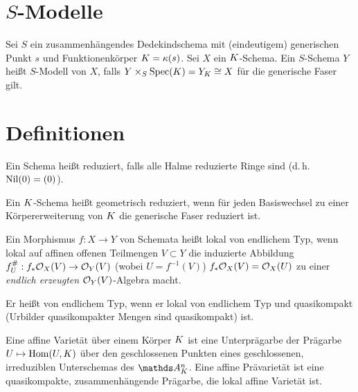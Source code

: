 \documentclass[german]{scrreprt}
\begin{document}
\chapter{$S$-Modelle}
\begin{Definition}[$S$-Modell]
Sei $S$ ein zusammenhängendes Dedekindschema mit (eindeutigem)
generischen Punkt $s$ und Funktionenkörper $K=\kappa(s)$.
Sei $X$ ein $K$-Schema.
Ein $S$-Schema $Y$ heißt $S$-Modell von $X$, falls
$Y\times_S\operatorname{Spec}(K)=Y_K\cong X$ für die generische Faser gilt.

\appendix
\chapter{Definitionen}
\begin{Definition}
  Ein Schema heißt reduziert, falls alle Halme reduzierte Ringe sind
  (d.\,h. $\operatorname{Nil}(0)=(0)$).

  Ein $K$-Schema heißt geometrisch reduziert, wenn für jeden
  Basiswechsel zu einer Körpererweiterung von $K$ die generische
  Faser reduziert ist. 
\end{Definition}

\begin{Definition}
Ein Morphismus $f\colon X\to Y$ von Schemata heißt lokal von endlichem
Typ, wenn lokal auf affinen offenen Teilmengen $V\subset Y$ die
induzierte Abbildung $f_U^\#: f_\ast\mathcal{O}_X(V)\to \mathcal{O}_Y(V)$
(wobei $U=f^{-1}(V)$) $f_\ast\mathcal{O}_X(V)=\mathcal{O}_X(U)$ zu einer \emph{endlich erzeugten}
$\mathcal{O}_Y(V)$-Algebra macht.

Er heißt von endlichem Typ, wenn er lokal von endlichem Typ und
quasikompakt (Urbilder quasikompakter Mengen sind quasikompakt) ist.
\end{Definition}

\begin{Definition}[Varietät]
Eine affine Varietät über einem Körper $K$ ist eine Unterprägarbe der Prägarbe 
$U\mapsto \operatorname{Hom}(U,K)$ über den geschlossenen Punkten eines
geschlossenen, irreduziblen Unterschemas des $\A_\K^n$.
Eine affine Prävarietät ist eine quasikompakte, zusammenhängende
Prägarbe, die lokal affine Varietät ist.


\end{Definition}
\end{Definition}
\end{document}
